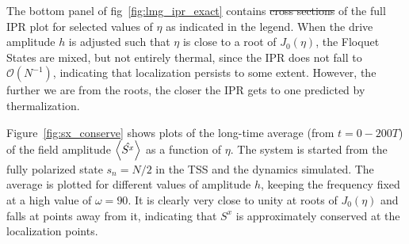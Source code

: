 \documentclass[%
reprint,
superscriptaddress,
amsmath,amssymb,
aps,
prb,
showkeys,
]{revtex4-2}
\providecommand{\DIFaddtex}[1]{{\protect\color{blue}\uwave{#1}}} %
\providecommand{\DIFdeltex}[1]{{\protect\color{red}\sout{#1}}}                      %
\providecommand{\DIFaddbegin}{} %
\providecommand{\DIFaddend}{} %
\providecommand{\DIFdelbegin}{} %
\providecommand{\DIFdelend}{} %
\providecommand{\DIFadd}[1]{\texorpdfstring{\DIFaddtex{#1}}{#1}} %
\providecommand{\DIFdel}[1]{\texorpdfstring{\DIFdeltex{#1}}{}} %
\newcommand{\DIFscaledelfig}{0.5}
\newlength{\DIFdelgraphicswidth} %
\newlength{\DIFdelgraphicsheight} %
\newcommand{\DIFaddincludegraphics}[2][]{{\color{blue}\fbox{\DIFOincludegraphics[#1]{#2}}}} %
\newcommand{\DIFdelincludegraphics}[2][]{%
\sbox{\DIFdelgraphicsbox}{\DIFOincludegraphics[#1]{#2}}%
\settoboxwidth{\DIFdelgraphicswidth}{\DIFdelgraphicsbox} %
\settoboxtotalheight{\DIFdelgraphicsheight}{\DIFdelgraphicsbox} %
\scalebox{\DIFscaledelfig}{%
\parbox[b]{\DIFdelgraphicswidth}{\usebox{\DIFdelgraphicsbox}\\[-\baselineskip] \rule{\DIFdelgraphicswidth}{0em}}\llap{\resizebox{\DIFdelgraphicswidth}{\DIFdelgraphicsheight}{%
\setlength{\unitlength}{\DIFdelgraphicswidth}%
\begin{picture}(1,1)%
\thicklines\linethickness{2pt} %
{\color[rgb]{1,0,0}\put(0,0){\framebox(1,1){}}}%
{\color[rgb]{1,0,0}\put(0,0){\line( 1,1){1}}}%
{\color[rgb]{1,0,0}\put(0,1){\line(1,-1){1}}}%
\end{picture}%
}\hspace*{3pt}}} %
} %
\DeclareRobustCommand{\DIFaddbegin}{\DIFOaddbegin \let\includegraphics\DIFaddincludegraphics} %
\DeclareRobustCommand{\DIFaddend}{\DIFOaddend \let\includegraphics\DIFOincludegraphics} %
\DeclareRobustCommand{\DIFdelbegin}{\DIFOdelbegin \let\includegraphics\DIFdelincludegraphics} %
\DeclareRobustCommand{\DIFdelend}{\DIFOaddend \let\includegraphics\DIFOincludegraphics} %
\begin{document}
The bottom panel of fig\DIFaddbegin \DIFadd{.}\DIFaddend ~\ref{fig:lmg_ipr_exact} contains \DIFdelbegin \DIFdel{cross sections }\DIFdelend \DIFaddbegin \DIFadd{cross-sections }\DIFaddend of the full IPR plot for selected values of $\eta$ as indicated in the legend. When the drive amplitude $h$ is adjusted such that $\eta$ is close to a root of $J_0(\eta)$, the Floquet States are mixed, but not entirely thermal, since the IPR does not fall to $\mathcal{O}(N^{-1})$, indicating that localization persists to some extent. However, the further we are from the roots, the closer the IPR gets to one predicted by thermalization.

Figure~\ref{fig:sx_conserve} shows plots of the long-time average (from $t=0-200T$) of the field amplitude $\expval{\hat{S^x}}$ as a function of $\eta$. The system is started from the fully polarized state $s_n=N/2$ in the TSS and the dynamics simulated. The average is plotted for different values of amplitude $h$, keeping the frequency fixed at a high value of $\omega=90$. It is clearly very close to unity at roots of $J_0(\eta)$ and falls at points away from it, indicating that $S^x$ is approximately conserved at the localization points.
\end{document}
